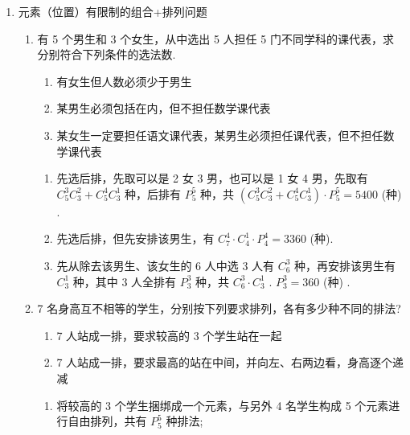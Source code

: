 \begin{enumerate}
\begin{enumerate}
\begin{jieda}
            因为 ${{C}}_{n}^{2} \geq  {{C}}_{n}^{3}$ ,则有 $\dfrac{n\left( {n - 1}\right) }{2 \times  1} \geq  \dfrac{n\left( {n - 1}\right) \left( {n - 2}\right) }{3 \times  2 \times  1}$ ,即 $n - 2 \leq  3$ ,解得 $n \leq  5$
            
            因此有 $3 \leq  n \leq  5$ , $n$ 为正整数,所以 $n$ 的取值可以是 3 或 4 或 5 .
        \end{jieda}
    \end{enumerate}
    
    \item 元素（位置）有限制的组合+排列问题
    \begin{enumerate}
        \item 有 5 个男生和 3 个女生，从中选出 5 人担任 5 门不同学科的课代表，求分别符合下列条件的选法数.
        \begin{enumerate}
            \item 有女生但人数必须少于男生
            \item 某男生必须包括在内，但不担任数学课代表
            \item 某女生一定要担任语文课代表，某男生必须担任课代表，但不担任数学课代表
        \end{enumerate}
        \begin{jieda}
            \begin{enumerate}
                \item 先选后排，先取可以是 2 女 3 男，也可以是 1 女 4 男，先取有 ${{C}}_{5}^{3}{{C}}_{3}^{2} + {{C}}_{5}^{4}{{C}}_{3}^{1}$ 种，后排有 $P_{5}^{5}$ 种，共 $\left( {{{C}}_{5}^{3}{{C}}_{3}^{2} + {{C}}_{5}^{4}{{C}}_{3}^{1}}\right)  \cdot  P_{5}^{5} = {5400}$ (种) .
                
                \item 先选后排，但先安排该男生，有 ${{C}}_{7}^{4} \cdot  {{C}}_{4}^{1} \cdot  P_{4}^{4} = {3360}$ (种).
                
                \item 先从除去该男生、该女生的 6 人中选 3 人有 ${{C}}_{6}^{3}$ 种，再安排该男生有 ${{C}}_{3}^{1}$ 种，其中 3 人全排有 $P_{3}^{3}$ 种，共 ${{C}}_{6}^{3} \cdot  {{C}}_{3}^{1}$ . $P_{3}^{3} = {360}$ (种) .
            \end{enumerate}
        \end{jieda}
        \item 7 名身高互不相等的学生，分别按下列要求排列，各有多少种不同的排法?
        \begin{enumerate}
            \item 7 人站成一排，要求较高的 3 个学生站在一起
            \item 7 人站成一排，要求最高的站在中间，并向左、右两边看，身高逐个递减
        \end{enumerate}
        \begin{jieda}
            \begin{enumerate}
                \item 将较高的 3 个学生捆绑成一个元素，与另外 4 名学生构成 5 个元素进行自由排列，共有 $P_{5}^{5}$ 种排法;


\end{enumerate}
\end{jieda}
\end{enumerate}
\end{enumerate}
